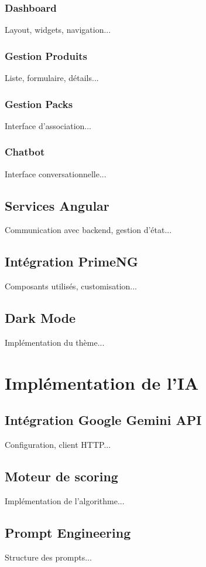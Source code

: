 \documentclass[12pt,a4paper]{report}
\begin{document}
\subsubsection{Dashboard}
Layout, widgets, navigation...

\subsubsection{Gestion Produits}
Liste, formulaire, détails...

\subsubsection{Gestion Packs}
Interface d'association...

\subsubsection{Chatbot}
Interface conversationnelle...

\subsection{Services Angular}
Communication avec backend, gestion d'état...

\subsection{Intégration PrimeNG}
Composants utilisés, customisation...

\subsection{Dark Mode}
Implémentation du thème...

\section{Implémentation de l'IA}
\subsection{Intégration Google Gemini API}
Configuration, client HTTP...

\subsection{Moteur de scoring}
Implémentation de l'algorithme...

\subsection{Prompt Engineering}
Structure des prompts...
\end{document}
